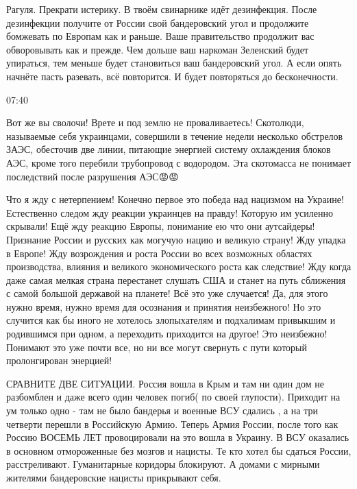 
Рагуля. Прекрати истерику. В твоём свинарнике идёт дезинфекция. После
дезинфекции получите от России свой бандеровский угол и продолжите бомжевать по
Европам как и раньше. Ваше правительство продолжит вас обворовывать как и
прежде. Чем дольше ваш наркоман Зеленский будет упираться, тем меньше будет
становиться ваш бандеровский угол. А если опять начнёте пасть разевать, всё
повторится. И будет повторяться до бесконечности.

07:40

Вот же вы сволочи! Врете и под землю не проваливаетесь! Скотолюди, называемые
себя украинцами, совершили в течение недели несколько обстрелов ЗАЭС, обесточив
две линии, питающие энергией систему охлаждения блоков АЭС, кроме того перебили
трубопровод с водородом. Эта скотомасса не понимает последствий после
разрушения АЭС😡😡


Что я жду с нетерпением! Конечно первое это победа над нацизмом на Украине!
Естественно следом жду реакции украинцев на правду! Которую им усиленно
скрывали! Ещё жду реакцию Европы, понимание ею что они аутсайдеры! Признание
России и русских как могучую нацию и великую страну! Жду упадка в Европе! Жду
возрождения и роста России во всех возможных областях производства, влияния и
великого экономического роста как следствие! Жду когда даже самая мелкая страна
перестанет слушать США и станет на путь сближения с самой большой державой на
планете! Всё это уже случается! Да, для этого нужно время, нужно время для
осознания и принятия неизбежного! Но это случится как бы иного не хотелось
злопыхателям и подхалимам привыкшим и родившимся при одном, а переходить
приходится на другое! Это неизбежно! Понимают это уже почти все, но ни все
могут свернуть с пути который пролонгирован энерцией!


СРАВНИТЕ ДВЕ СИТУАЦИИ. Россия вошла в Крым и там ни один дом не разбомблен и
даже всего один человек погиб( по своей глупости). Приходит на ум только одно -
там не было бандерья и военные ВСУ сдались , а на три четверти перешли в
Российскую Армию. Теперь Армия России, после того как Россию ВОСЕМЬ ЛЕТ
провоцировали на это вошла в Украину. В ВСУ оказались в основном отмороженные
без мозгов и нацисты. Те кто хотел бы сдаться России, расстреливают.
Гуманитарные коридоры блокируют. А домами с мирными жителями бандеровские
нацисты прикрывают себя.


